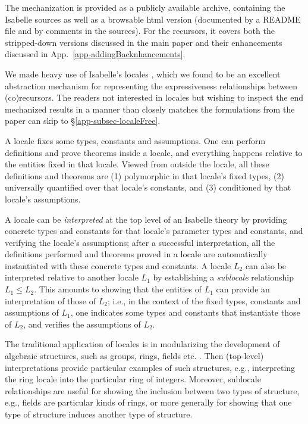 The mechanization is 
provided as a publicly available archive, 
containing the Isabelle sources as well as a browsable html version (documented by a README file and by comments in the sources).    
%
For the recursors, it covers both the stripped-down versions %
discussed in the main paper and their enhancements discussed in App.~\ref{app-addingBacknhancements}. %

We made heavy use of Isabelle's locales \cite{DBLP:conf/tphol/KammullerWP99,DBLP:journals/jar/Ballarin14}, which we found to be an excellent abstraction mechanism for representing the expressiveness relationships between (co)recursors. The readers not interested in locales but wishing to inspect the end mechanized results in a manner than closely matches the formulations from the paper can skip to \S\ref{app-subsec-localeFree}. 
%


A locale fixes some types, constants and assumptions.
One can perform definitions and prove theorems inside a locale, and everything happens relative to the entities fixed in that locale. Viewed from outside the locale, all these definitions and theorems are (1) polymorphic in that locale's fixed types, (2) universally quantified over that locale's constants, and (3) conditioned by that locale's assumptions. 
%

A locale can be \emph{interpreted} at the top level of an Isabelle theory by providing concrete types and constants for that locale's %
parameter types and constants, and verifying the locale's assumptions; after a successful interpretation, all the definitions performed and theorems proved in a locale are automatically instantiated with these concrete types and constants. 
%
A locale $L_2$ can also be interpreted relative to another locale $L_1$ by establishing a \emph{sublocale} relationship $L_1 \leq L_2$. This amounts to showing that the entities of $L_1$ can provide an interpretation of those of $L_2$; i.e., in the context of the fixed types, constants and assumptions of $L_1$,  one indicates some types and constants that instantiate those of $L_2$, and verifies the assumptions of $L_2$. 
%
%

The traditional application of locales is in %
modularizing the development of algebraic structures, such as groups, rings, fields etc. \cite{DBLP:journals/jar/Ballarin14,DBLP:journals/jar/Ballarin20}.  
Then (top-level) interpretations provide particular examples of such structures, e.g., interpreting the ring locale into the particular ring of integers. Moreover, sublocale relationships are useful for showing the inclusion between two types of structure, e.g., fields are particular kinds of rings, or more generally for showing that one type of structure induces another type of structure. 
%

